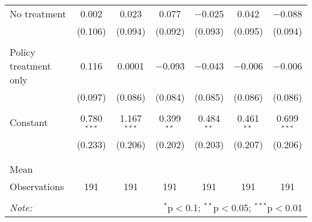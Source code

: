 \begin{tabular}{@{\extracolsep{5pt}}lcccccc}
 No treatment & 0.002 & 0.023 & 0.077 & $-$0.025 & 0.042 & $-$0.088 \\ 
  & (0.106) & (0.094) & (0.092) & (0.093) & (0.095) & (0.094) \\ 
  & & & & & & \\ 
 Policy treatment only & 0.116 & 0.0001 & $-$0.093 & $-$0.043 & $-$0.006 & $-$0.006 \\ 
  & (0.097) & (0.086) & (0.084) & (0.085) & (0.086) & (0.086) \\ 
  & & & & & & \\ 
 Constant & 0.780$^{***}$ & 1.167$^{***}$ & 0.399$^{**}$ & 0.484$^{**}$ & 0.461$^{**}$ & 0.699$^{***}$ \\ 
  & (0.233) & (0.206) & (0.202) & (0.203) & (0.207) & (0.206) \\ 
  & & & & & & \\ 
\hline \\[-1.8ex] 
Mean &  &  &  &  &  &  \\ 
Observations & 191 & 191 & 191 & 191 & 191 & 191 \\ 
\hline 
\hline \\[-1.8ex] 
\textit{Note:}  & \multicolumn{6}{r}{$^{*}$p$<$0.1; $^{**}$p$<$0.05; $^{***}$p$<$0.01} \\ 
\end{tabular} 
